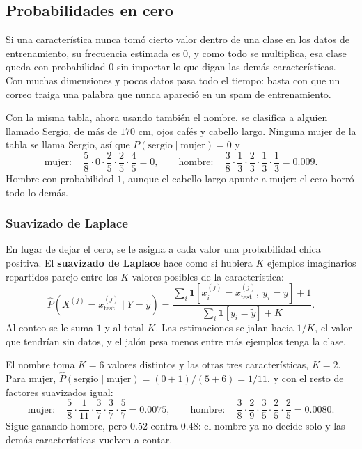 \documentclass[11pt,letterpaper]{article}
\begin{document}

\subsection*{Probabilidades en cero}

Si una característica nunca tomó cierto valor dentro de una clase en
los datos de entrenamiento, su frecuencia estimada es $0$, y como todo
se multiplica, esa clase queda con probabilidad $0$ sin importar lo
que digan las demás características. Con muchas dimensiones y pocos
datos pasa todo el tiempo: basta con que un correo traiga una palabra
que nunca apareció en un spam de entrenamiento.

\begin{ejemplo}
    Con la misma tabla, ahora usando también el nombre, se clasifica a
    alguien llamado Sergio, de más de $170$ cm, ojos cafés y cabello
    largo. Ninguna mujer de la tabla se llama Sergio, así que
    $P(\text{sergio} \mid \text{mujer}) = 0$ y
    \[
        \text{mujer}: \quad \frac{5}{8} \cdot 0 \cdot \frac{2}{5}
        \cdot \frac{2}{5} \cdot \frac{4}{5} = 0 ,
        \qquad
        \text{hombre}: \quad \frac{3}{8} \cdot \frac{1}{3} \cdot
        \frac{2}{3} \cdot \frac{1}{3} \cdot \frac{1}{3} = 0.009 .
    \]
    Hombre con probabilidad $1$, aunque el cabello largo apunte a
    mujer: el cero borró todo lo demás.
\end{ejemplo}

\subsubsection*{Suavizado de Laplace}

En lugar de dejar el cero, se le asigna a cada valor una probabilidad
chica positiva. El \textbf{suavizado de Laplace} hace como si hubiera
$K$ ejemplos imaginarios repartidos parejo entre los $K$ valores
posibles de la característica:
\[
    \hat{P}\!\left(X^{(j)} = x_{\text{test}}^{(j)} \mid Y = \tilde{y}
    \right)
    = \frac{\displaystyle\sum_i \mathbf{1}\!\left[x_i^{(j)}
      = x_{\text{test}}^{(j)},\ y_i = \tilde{y}\right] + 1}
      {\displaystyle\sum_i \mathbf{1}\!\left[y_i = \tilde{y}\right]
      + K} .
\]
Al conteo se le suma $1$ y al total $K$. Las estimaciones se jalan
hacia $1/K$, el valor que tendrían sin datos, y el jalón pesa menos
entre más ejemplos tenga la clase.

\begin{ejemplo}
    El nombre toma $K = 6$ valores distintos y las otras tres
    características, $K = 2$. Para mujer,
    $\hat{P}(\text{sergio} \mid \text{mujer}) = (0 + 1)/(5 + 6) =
    1/11$, y con el resto de factores suavizados igual:
    \[
        \text{mujer}: \quad \frac{5}{8} \cdot \frac{1}{11} \cdot
        \frac{3}{7} \cdot \frac{3}{7} \cdot \frac{5}{7} = 0.0075 ,
        \qquad
        \text{hombre}: \quad \frac{3}{8} \cdot \frac{2}{9} \cdot
        \frac{3}{5} \cdot \frac{2}{5} \cdot \frac{2}{5} = 0.0080 .
    \]
    Sigue ganando hombre, pero $0.52$ contra $0.48$: el nombre ya no
    decide solo y las demás características vuelven a contar.
\end{ejemplo}
\end{document}
